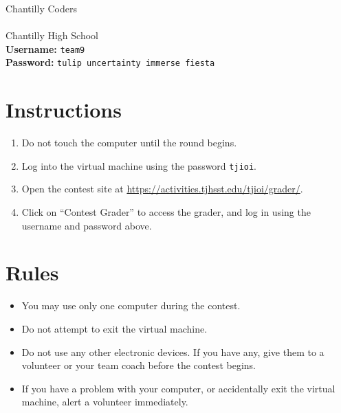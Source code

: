 \documentclass[12pt]{article}
\begin{document}
{\Huge Chantilly Coders}\\\\
{\Large Chantilly High School}\\

\textbf{Username:} \verb|team9|\\
\textbf{Password:} \verb|tulip uncertainty immerse fiesta|

\section*{Instructions}

\begin{enumerate}
    \item Do not touch the computer until the round begins.
    \item Log into the virtual machine using the password \verb|tjioi|.
    \item Open the contest site at \url{https://activities.tjhsst.edu/tjioi/grader/}.
    \item Click on ``Contest Grader'' to access the grader, and log in using the username and password above.
\end{enumerate}

\section*{Rules}

\begin{itemize}
    \item You may use only one computer during the contest.
    \item Do not attempt to exit the virtual machine.
    \item Do not use any other electronic devices. If you have any, give them to a volunteer or your team coach before the contest begins.
    \item If you have a problem with your computer, or accidentally exit the virtual machine, alert a volunteer immediately.
\end{itemize}
\end{document}
